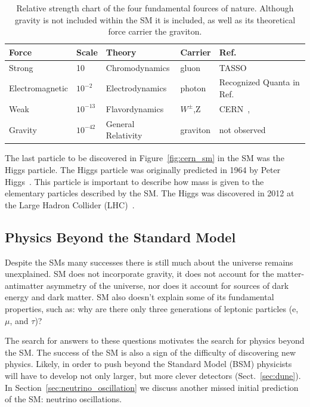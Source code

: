 \begin{table}
\begin{center}
\begin{tabular}{||p{30mm} p{20mm} p{40mm} p{25mm} p{35mm}||}
 \hline
 Force & Scale & Theory & Carrier & Ref. \\ [0.5ex]
 \hline\hline
 Strong & 10 & Chromodynamics & gluon & TASSO~\citep{tasso_1978_BRANDELIK1979243, PETRA_PhysRevLett.43.830} \\
 \hline
 Electromagnetic & $10^{-2} $ & Electrodynamics & photon & Recognized Quanta in Ref.~\citep{https://doi.org/10.1002/andp.19053220607} \\
 \hline
 Weak & $10^{-13}$ & Flavordynamics & $W^{\pm}$,Z & CERN~\citep{wboson_measure_ARNISON1983103},\citep{zboson_measure_1983398}\\
 \hline
 Gravity & $10^{-42}$ & General Relativity & graviton  & not observed \\
 \hline
 \hline
\end{tabular}
\caption{Relative strength chart of the four fundamental fources of nature. 
Although gravity is not included within the SM it is included, as well as its theoretical force carrier the graviton.
}
\label{table:forces}
\end{center}
\end{table}

The last particle to be discovered in Figure~\ref{fig:cern_sm} in the SM was the Higgs particle.
The Higgs particle was originally predicted in 1964 by Peter Higgs~\citep{HIGGS1964132}.
This particle is important to describe how mass is given to the elementary particles described by the SM.
The Higgs was discovered in 2012 at the Large Hadron Collider (LHC)~\citep{higgs_discovery_20121}.

\subsection{Physics Beyond the Standard Model}

Despite the SMs many successes there is still much about the universe remains unexplained.
SM does not incorporate gravity, it does not account for the matter-antimatter asymmetry of the universe, nor does it account for sources of dark energy and dark matter.
SM also doesn't explain some of its fundamental properties, such as: why are there only three generations of leptonic particles (e, $\mu$, and $\tau$)?

The search for answers to these questions motivates the search for physics beyond the SM.
The success of the SM is also a sign of the difficulty of discovering new physics.
Likely, in order to push beyond the Standard Model (BSM) physicists will have to develop not only larger, but more clever detectors (Sect.~\ref{sec:dune}).
In Section~\ref{sec:neutrino_oscillation} we discuss another missed initial prediction of the SM: neutrino oscillations. 

